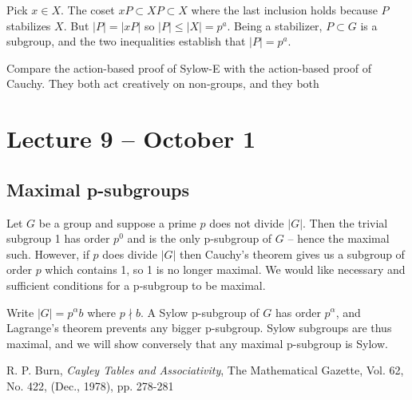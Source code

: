 \documentclass[letterpaper]{article}
\begin{document}
Pick $x \in X$. The coset $xP \subset XP \subset X$ where the last inclusion holds because $P$ stabilizes $X$. But $|P| = |xP|$ so $|P| \leq |X| = p^a$. Being a stabilizer, $P \subset G$ is a subgroup, and the two inequalities establish that $|P| = p^a$.

Compare the action-based proof of Sylow-E with the action-based proof of Cauchy. They both act creatively on non-groups, and they both 

\section{Lecture 9 -- October 1}

\subsection{Maximal p-subgroups}

Let $G$ be a group and suppose a prime $p$ does not divide $|G|$. Then the trivial subgroup 1 has order $p^0$ and is the only p-subgroup of $G$ -- hence the maximal such. However, if $p$ does divide $|G|$ then Cauchy's theorem gives us a subgroup of order $p$ which contains 1, so 1 is no longer maximal. We would like necessary and sufficient conditions for a p-subgroup to be maximal.

Write $|G| = p^\alpha b$ where $p \nmid b$. A Sylow p-subgroup of $G$ has order $p^\alpha$, and Lagrange's theorem prevents any bigger p-subgroup. Sylow subgroups are thus maximal, and we will show conversely that any maximal p-subgroup is Sylow.

\begin{thebibliography}{7}
 R. P. Burn, \emph{Cayley Tables and Associativity},
The Mathematical Gazette, Vol. 62, No. 422, (Dec., 1978), pp. 278-281
\end{thebibliography}
\end{document}
